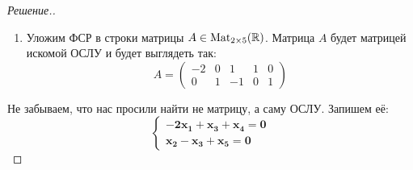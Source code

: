 \documentclass[a4paper]{article}
\makeatletter
\newcommand{\Mat}{\operatorname{Mat}}
\theoremstyle{remark}
\newenvironment{sysmatrix}[1]
{
    \left(\begin{array}{@{}#1@{}}
}
{\end{array}\right)}
\newcommand{\smt}[2]{\begin{sysmatrix}{#1} #2\end{sysmatrix}}
\newcommand{\arron}[3]{%
  \ensuremath{\xrightarrow{\text{Э}_1(#1,\; #2,\; #3)}}%
}
\makeatother
\begin{document}
\begin{proof}[Решение.]
\begin{enumerate}
\begin{multline*}
{              1 & 0 & 0 & 2 & 0 & 0 \\
              0 & 1 & 1 & -1 & 0 & 0 \\
              0 & 0 & 1 & -1 & 1 & 0
            } \to\\
            {\arron{2}{3}{-1}} \smt{ccccc|c}{
              1 & 0 & 0 & 2 & 0 & 0 \\
              0 & 1 & 0 & 0 & -1 & 0 \\
              0 & 0 & 1 & -1 & 1 & 0
            }
          \end{multline*}
          Дальше легко восстановить решение ОСЛУ, но нас интересует ФСР. Она будет выглядеть следующим образом:
          \begin{equation*}
            u_1 = \begin{pmatrix}
              -2 \\
              0 \\
              1 \\
              1 \\
              0
            \end{pmatrix},\ u_2 = \begin{pmatrix}
              0 \\
              1 \\
              -1 \\
              0 \\
              1
            \end{pmatrix}
          \end{equation*}
          \item Уложим ФСР в строки матрицы $A \in \Mat_{2 \times 5}(\RR)$. Матрица $A$ будет матрицей искомой ОСЛУ и будет выглядеть так:
          \begin{equation*}
            A = \begin{pmatrix}
              -2 & 0 & 1 & 1 & 0 \\
              0 & 1 & -1 & 0 & 1
            \end{pmatrix}
          \end{equation*}
        \end{enumerate}
        Не забываем, что нас просили найти не матрицу, а саму ОСЛУ. Запишем её:
        \begin{equation*}
          \begin{cases}
            \bm{-2x_1 + x_3 + x_4 = 0} \\
            \bm{x_2 - x_3 + x_5 = 0}
          \end{cases}
        \end{equation*} 
      \end{proof}
\end{document}
